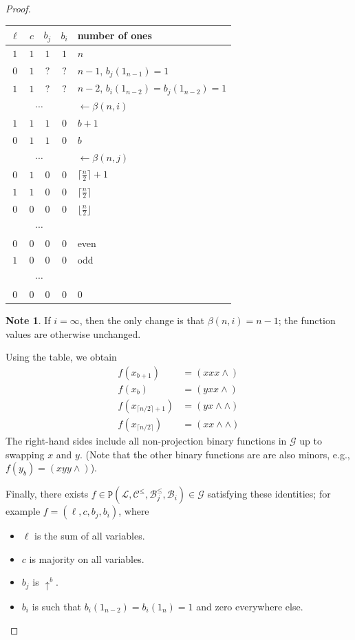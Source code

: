 \documentclass{amsart}
\numberwithin{equation}{section}
\theoremstyle{plain}
\theoremstyle{definition}
\newtheorem*{note}{Note}
\def\clone#1{\mathcal{#1}}
\def\minion#1{\mathcal{#1}}
\def\Bc{\clone{B}}
\def\Lc{\clone{L}}
\def\Cc{\clone{C}}
\def\atleast#1{\uparrow^{#1}}
\def\C#1{{\mathtt{P}}(#1)}
\begin{document}
\begin{proof}
\begin{center}
\begin{tabular}{ |cccc|l } 
 \hline
 $\ell$ & $c$ & $b_j$ & $b_i$ & number of ones \\ 
  \hline
     $1$ & $1$ & $1$ & $1$ & $n$ \\ 
     $0$ & $1$ & $?$ & $?$ & $n-1$, $b_j(1_{n-1}) = 1$ \\ 
     $1$ & $1$ & $?$ & $?$ & $n-2$, $b_i(1_{n-2}) = b_j(1_{n-2}) = 1$ \\
\multicolumn{4}{|c|}{$\cdots$} & \color{gray}$\longleftarrow\beta(n,i)$ \\
     $1$ & $1$ & $1$ & $0$ &  $b+1$ \\
     $0$ & $1$ & $1$ & $0$ &  $b$ \\
\multicolumn{4}{|c|}{$\cdots$}  & \color{gray}$\longleftarrow\beta(n,j)$\\
     $0$ & $1$ & $0$ & $0$ & $\lceil\frac{n}{2}\rceil +1$ \\
     $1$ & $1$ & $0$ & $0$ & $\lceil\frac{n}{2}\rceil$ \\
     $0$ & $0$ & $0$ & $0$ & $\lfloor\frac{n}{2}\rfloor$ \\
\multicolumn{4}{|c|}{$\cdots$} \\
     $0$ & $0$ & $0$ & $0$ & even \\
     $1$ & $0$ & $0$ & $0$ & odd \\
\multicolumn{4}{|c|}{$\cdots$} \\
     $0$ & $0$ & $0$ & $0$ & $0$\\
 \hline
\end{tabular}
\end{center}

\begin{note}
If $i=\infty$, then the only change is that $\beta(n,i) = n-1$; the function values are otherwise unchanged.
\end{note}

Using the table, we obtain  
\begin{align*}
f(x_{b+1}) &= (xxx{\wedge}) \\
f(x_b) &= (yxx{\wedge}) \\
f(x_{\lceil n/2 \rceil +1}) &= (yx{\wedge}{\wedge}) \\
f(x_{\lceil n/2 \rceil}) &= (xx{\wedge}{\wedge})
\end{align*}
The right-hand sides include all non-projection binary functions in $\minion{G}$ up to swapping $x$ and $y$.
(Note that the other binary functions are are also minors, e.g., $f(y_b) = (xyy{\wedge})$).

Finally, there exists $f\in\C{\Lc,\Cc^\leq,\Bc_j^\leq,\Bc_i}\in\minion{G}$ satisfying these identities; for example $f=(\ell,c,b_j,b_i)$, where
\begin{itemize}
\item $\ell$ is the sum of all variables.
\item $c$ is majority on all variables.
\item $b_j$ is $\atleast{b}$.
\item $b_i$ is such that $b_i(1_{n-2}) = b_i(1_n) = 1$ and zero everywhere
else.
\end{itemize}
\end{proof}
\end{document}
